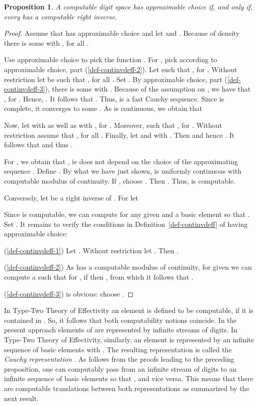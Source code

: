 \documentclass[microtype]{jloganal}
\theoremstyle{plain}
\newtheorem{proposition}[theorem]{Proposition}
\theoremstyle{definition}
\begin{document}
\begin {proposition}\label{prop-choice-inv}
A computable digit space  has approximable choice if, and only if, every  has a computable right inverse.
\end{proposition}
\begin{proof}
Assume that  has approximable choice and let  and . Because of density there is some  with , for all .

Use approximable choice to pick the function 
.  
For , pick  according to approximable choice, part (\ref{def-continvdeff-2}).
Let  such that , for . 
Without restriction let  be such that , for all . Set .
By approximable choice, part (\ref{def-continvdeff-3}), there is some  with
.
Because of the assumption on , we have that , 
for . Hence, . It follows that 
. Thus,  is a fast Cauchy sequence. 
Since  is complete, it converges to some . 
As  is continuous, we obtain that 


Now, let  with  as well as  with , for . Moreover,  such that , for . Without restriction assume that , for all . Finally, let  and  with . Then  and hence . It follows that  and thus .

For , we obtain that , ie  does not depend on the choice of the approximating sequence . Define . By what we have just shown,  is uniformly continuous with computable modulus of continuity. If , choose . Then . Thus,  is computable.

Conversely, let  be a right inverse of . For  let 

Since  is computable, we can compute for any given  and  a basic element  so that . Set . It remains to verify the conditions in Definition~\ref{def-continvdeff} of having approximable choice:

(\ref{def-continvdeff-1}) Let . Without restriction let . Then .

(\ref{def-continvdeff-2}) As  has a computable modulus of continuity, for given  we can compute a  such that for , if  then , from which it follows that
. 


(\ref{def-continvdeff-3}) is obvious: choose .
\end{proof}

In Type-Two Theory of Effectivity an element  is defined to be computable, if it is contained in . So, it follows that both computability notions coincide. In the present approach elements of  are represented by infinite streams of digits. In Type-Two Theory of Effectivity, similarly, an element  is represented by an infinite sequence  of basic elements with . The resulting representation is called the \emph{Cauchy representation} . As follows from the proofs leading to the preceding proposition, one can computably pass from an infinite stream  of digits to an infinite sequence of basic elements  so that , and vice versa. This means that there are computable translations between both representations as summarized by the next result.
\end{document}
